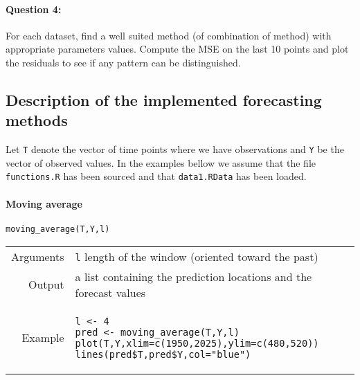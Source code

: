 \documentclass[11pt]{scrartcl}
\begin{document}
\paragraph{Question 4: }
For each dataset, find a well suited method (of combination of method) with appropriate parameters values. Compute the MSE on the last 10 points and plot the residuals to see if any pattern can be distinguished.


\subsection*{Description of the implemented forecasting methods}
Let \verb!T! denote the vector of time points where we have observations and \verb!Y! be the vector of observed values. In the examples bellow we assume that the file \verb!functions.R! has been sourced and that \verb!data1.RData! has been loaded.

\paragraph{Moving average} \verb!moving_average(T,Y,l)!\\
\begin{tabular}{rl}
	Arguments & \verb!l! length of the window (oriented toward the past)\\ \vspace{4mm}
	Output & a list containing the prediction locations and the forecast values\\ \vspace{4mm}
	Example & 
	\begin{minipage}{10cm}	
	\begin{verbatim}
l <- 4
pred <- moving_average(T,Y,l)
plot(T,Y,xlim=c(1950,2025),ylim=c(480,520))
lines(pred$T,pred$Y,col="blue")
	\end{verbatim}
	\end{minipage}
\end{tabular}\\

\end{document}
